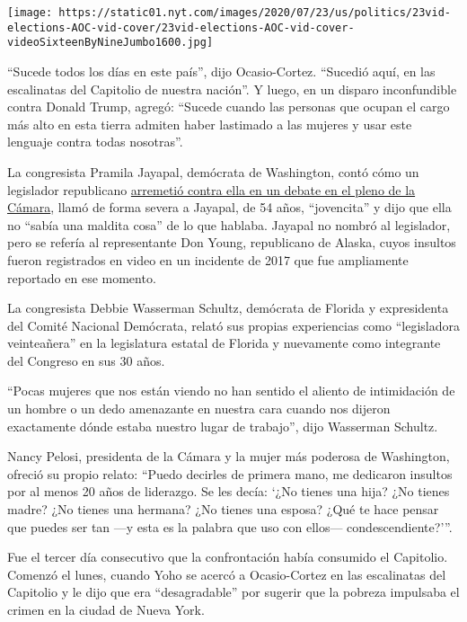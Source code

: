\texttt{[image: https://static01.nyt.com/images/2020/07/23/us/politics/23vid-elections-AOC-vid-cover/23vid-elections-AOC-vid-cover-videoSixteenByNineJumbo1600.jpg]}

``Sucede todos los días en este país'', dijo Ocasio-Cortez. ``Sucedió
aquí, en las escalinatas del Capitolio de nuestra nación''. Y luego, en
un disparo inconfundible contra Donald Trump, agregó: ``Sucede cuando
las personas que ocupan el cargo más alto en esta tierra admiten haber
lastimado a las mujeres y usar este lenguaje contra todas nosotras''.

La congresista Pramila Jayapal, demócrata de Washington, contó cómo un
legislador republicano
\href{https://www.facebook.com/seattletimes/videos/rep-pramila-jayapal-called-a-young-lady-by-alaska-congressman/10155535644411215/}{arremetió
contra ella en un debate en el pleno de la Cámara}, llamó de forma
severa a Jayapal, de 54 años, ``jovencita'' y dijo que ella no ``sabía
una maldita cosa'' de lo que hablaba. Jayapal no nombró al legislador,
pero se refería al representante Don Young, republicano de Alaska, cuyos
insultos fueron registrados en video en un incidente de 2017 que fue
ampliamente reportado en ese momento.

La congresista Debbie Wasserman Schultz, demócrata de Florida y
expresidenta del Comité Nacional Demócrata, relató sus propias
experiencias como ``legisladora veinteañera'' en la legislatura estatal
de Florida y nuevamente como integrante del Congreso en sus 30 años.

``Pocas mujeres que nos están viendo no han sentido el aliento de
intimidación de un hombre o un dedo amenazante en nuestra cara cuando
nos dijeron exactamente dónde estaba nuestro lugar de trabajo'', dijo
Wasserman Schultz.

Nancy Pelosi, presidenta de la Cámara y la mujer más poderosa de
Washington, ofreció su propio relato: ``Puedo decirles de primera mano,
me dedicaron insultos por al menos 20 años de liderazgo. Se les decía:
`¿No tienes una hija? ¿No tienes madre? ¿No tienes una hermana? ¿No
tienes una esposa? ¿Qué te hace pensar que puedes ser tan ---y esta es
la palabra que uso con ellos--- condescendiente?'''.

Fue el tercer día consecutivo que la confrontación había consumido el
Capitolio. Comenzó el lunes, cuando Yoho se acercó a Ocasio-Cortez en
las escalinatas del Capitolio y le dijo que era ``desagradable'' por
sugerir que la pobreza impulsaba el crimen en la ciudad de Nueva York.

